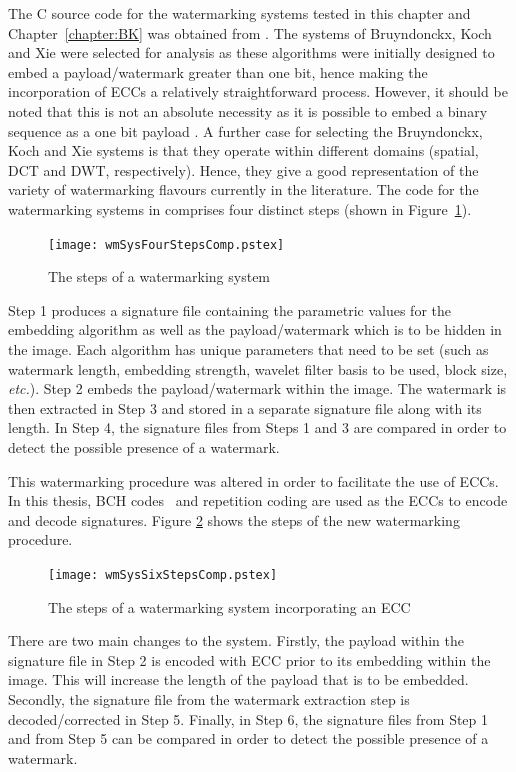 \documentclass[12pt]{report}
\begin{document}
The C source code for the watermarking systems tested in this chapter 
and Chapter~\ref{chapter:BK}
was obtained from \cite{meerMasters}.
The systems of Bruyndonckx, Koch and Xie were selected for analysis as these algorithms were initially
designed to embed a payload/watermark greater than one bit, hence making the incorporation of ECCs a relatively straightforward
process. However, it should be noted that this is not an absolute necessity as it is possible to
embed a binary sequence as a one bit payload \cite{ECCb4:herr, mc_frid2}. 
A further case for selecting the Bruyndonckx, Koch and Xie systems is that they operate within
different domains (spatial, DCT and DWT, respectively). 
Hence, they give a good representation 
of the variety of watermarking flavours currently in the literature.
The code for the watermarking systems in \cite{meerMasters} comprises four distinct steps
(shown in Figure~\ref{wmSysFourSteps}).
\begin{figure}[htb]
	\begin{center}
		\texttt{[image: wmSysFourStepsComp.pstex]}
		\caption{The steps of a watermarking system}
		\label{wmSysFourSteps}
	\end{center}
\end{figure}
Step 1 produces a signature file containing the parametric values for the embedding algorithm as
well as the payload/watermark which is to be hidden in the image. Each algorithm has unique parameters that need 
to be set (such as watermark length, embedding strength, wavelet filter basis to be used, block size, 
\emph{etc.}).
Step 2 embeds the payload/watermark within 
the image. The watermark is then extracted in Step 3 and stored in a separate signature file
along with its length. In Step 4, the signature files from Steps 1 and 3
are compared in order to detect the possible presence of a watermark.

This watermarking procedure was altered in order to facilitate the use of ECCs. 
In this thesis, BCH codes~\cite{M_ZCONC} and repetition coding are used as the ECCs to encode and
decode signatures.
Figure 
\ref{wmSysSixSteps} shows the steps of the new watermarking procedure.
\begin{figure}[htb]
	\begin{center}
		\texttt{[image: wmSysSixStepsComp.pstex]}
		\caption{The steps of a watermarking system incorporating an ECC}
		\label{wmSysSixSteps}
	\end{center}
\end{figure}
There are two main changes to the system.  Firstly, the payload within the signature
file in Step 2 is encoded with ECC prior to its embedding within the image. This will increase 
the length of the payload that is to be embedded.
Secondly, the
signature file from the watermark extraction step is decoded/corrected in Step 5.
Finally, in Step 6, the signature files from Step 1 and from Step 5 can be compared in order to detect
the possible presence of a watermark.   
\end{document}
